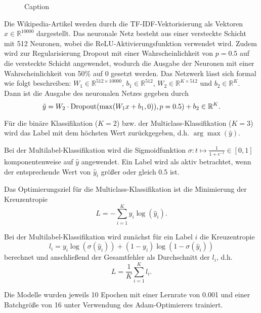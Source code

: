 \begin{figure}[H]
    \centering
    
    \caption{Caption}
\end{figure}
Die Wikipedia-Artikel werden durch die TF-IDF-Vektorisierung als Vektoren $x\in\mathbb{R}^{10000}$ dargestellt. Das neuronale Netz besteht aus einer versteckte Schicht mit 512 Neuronen, wobei die ReLU-Aktivierungsfunktion verwendet wird. Zudem wird zur Regularisierung Dropout mit einer Wahrscheinlichkeit von $p=0.5$ auf die versteckte Schicht angewendet, wodurch die Ausgabe der Neuronen mit einer Wahrscheinlichkeit von 50\% auf 0 gesetzt werden. Das Netzwerk lässt sich formal wie folgt beschreiben: $W_1\in\mathbb{R}^{512\times 10000}$, $b_1\in\mathbb{R}^{512}$, $W_2\in\mathbb{R}^{K\times 512}$ und $b_2\in\mathbb{R}^{K}$. Dann ist die Ausgabe des neuronalen Netzes gegeben durch
\begin{equation*}
    \hat{y} = W_2\cdot \operatorname*{Dropout}(\max(W_1x + b_1, 0)), p=0.5) + b_2\in\mathbb{R}^{K}.
\end{equation*}

Für die binäre Klassifikation ($K=2$) bzw. der Multiclass-Klassifikation ($K=3$) wird das Label mit dem höchsten Wert zurückgegeben, d.h. $\arg\max (\hat{y})$.

Bei der Multilabel-Klassifikation wird die Sigmoidfunktion $\sigma\colon t\mapsto \frac{1}{1 + e^{-t}}\in [0, 1]$ komponentenweise auf $\hat{y}$ angewendet. Ein Label wird als aktiv betrachtet, wenn der entsprechende Wert von $\hat{y}_i$ größer oder gleich 0.5 ist.

Das Optimierungsziel für die Multiclass-Klassifikation ist die Minimierung der Kreuzentropie
\begin{equation*}
    L = - \sum_{i=1}^{K}y_i\log(\hat{y}_i).
\end{equation*}

Bei der Multilabel-Klassifikation wird zunächst für ein Label $i$ die Kreuzentropie
\begin{equation*}
    l_i = y_i\log (\sigma(\hat{y}_i)) + (1 - y_i)\log (1 - \sigma(\hat{y}_i))
\end{equation*}
berechnet und anschließend der Gesamtfehler als Durchschnitt der $l_i$, d.h.
\begin{equation*}
    L = \frac{1}{K}\sum_{i=1}^{K} l_i.
\end{equation*}

Die Modelle wurden jeweils 10 Epochen mit einer Lernrate von 0.001 und einer Batchgröße von 16 unter Verwendung des Adam-Optimierers trainiert.
